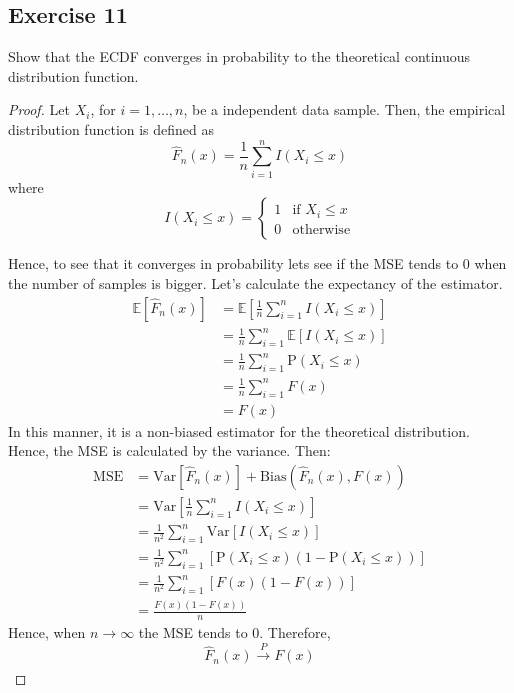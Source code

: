 \documentclass[11pt]{article}
\theoremstyle{definition}
\theoremstyle{remark}
\theoremstyle{remark}
\newcommand{\E}[1]{\mathbb{E}\left[#1 \right]}
\newcommand{\V}[1]{\mathrm{Var}\left[#1 \right]}
\renewcommand{\P}[1]{\mathrm{P}\left(#1 \right)}
\begin{document}
\subsection*{Exercise 11}
Show that the ECDF converges in probability to the theoretical
continuous distribution function.
\begin{proof}
  Let $X_i$, for $i=1,\ldots,n$, be a independent data sample. Then,
  the empirical distribution function is defined as
  \begin{equation*}
    \hat{F}_n(x) = \frac{1}{n} \sum_{i=1}^nI(X_i \le x)
  \end{equation*}
  where
  \begin{equation*}
    I(X_i \le x) =
    \begin{cases}
      1 &\text{if } X_i \le x \\
      0 &\text{otherwise}
    \end{cases}
  \end{equation*}

  Hence, to see that it converges in probability lets see if the MSE
  tends to 0 when the number of samples is bigger. Let's calculate the
  expectancy of the estimator.
  \begin{align*}
    \E{\hat{F}_n(x)} &= \E{\frac{1}{n}\sum_{i=1}^nI(X_i \le x)} \\
                     &=\frac{1}{n}\sum_{i=1}^n \E{I(X_i \le x)} \\
                     &= \frac{1}{n} \sum_{i=1}^n \P{X_i \le x} \\
                     &= \frac{1}{n} \sum_{i=1}^nF(x) \\
                     &= F(x)
  \end{align*}
  In this manner, it is a non-biased estimator for the theoretical
  distribution. Hence, the MSE is calculated by the variance. Then:
  \begin{align*}
    \mathrm{MSE} &= \V{\hat{F}_n(x)} + \mathrm{Bias}\left(\hat{F}_n(x), F(x)\right)\\
                 &= \V{\frac{1}{n} \sum_{i=1}^n I(X_i \le x)} \\
                 &= \frac{1}{n^2} \sum_{i=1}^n \V{I(X_i \le x)} \\
                 &= \frac{1}{n^2} \sum_{i=1}^n \left[\P{X_i \le x}(1 - \P{X_i \le x})\right] \\
                 &= \frac{1}{n^2} \sum_{i=1}^n \left[F(x)(1 - F(x))\right] \\
                 &= \frac{F(x)(1 - F(x))}{n}
  \end{align*}
  Hence, when $n \rightarrow \infty$ the MSE tends to 0. Therefore,
  \begin{equation*}
    \hat{F}_n(x) \xrightarrow[]{P} F(x)
  \end{equation*}
\end{proof}
\end{document}
